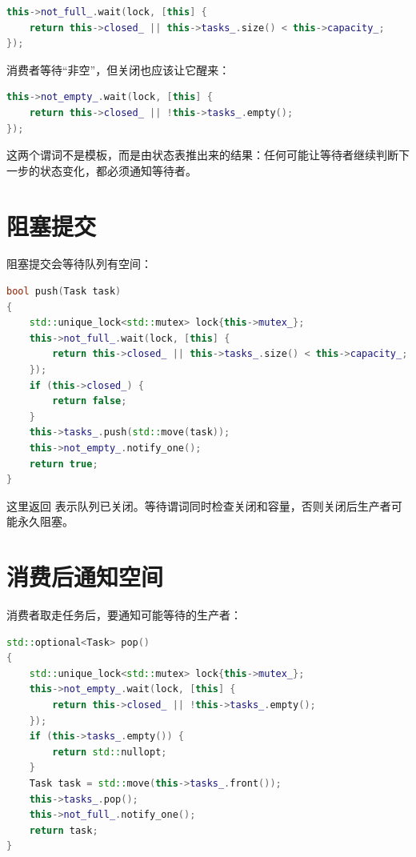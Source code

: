 \begin{lstlisting}[language=C++,caption={等待条件包含关闭状态}]
this->not_full_.wait(lock, [this] {
    return this->closed_ || this->tasks_.size() < this->capacity_;
});
\end{lstlisting}

消费者等待“非空”，但关闭也应该让它醒来：

\begin{lstlisting}[language=C++,caption={消费者等待条件也包含关闭状态}]
this->not_empty_.wait(lock, [this] {
    return this->closed_ || !this->tasks_.empty();
});
\end{lstlisting}

这两个谓词不是模板，而是由状态表推出来的结果：任何可能让等待者继续判断下一步的状态变化，都必须通知等待者。

\section{阻塞提交}

阻塞提交会等待队列有空间：

\begin{lstlisting}[language=C++,caption={队列满时等待}]
bool push(Task task)
{
    std::unique_lock<std::mutex> lock{this->mutex_};
    this->not_full_.wait(lock, [this] {
        return this->closed_ || this->tasks_.size() < this->capacity_;
    });
    if (this->closed_) {
        return false;
    }
    this->tasks_.push(std::move(task));
    this->not_empty_.notify_one();
    return true;
}
\end{lstlisting}

这里返回  表示队列已关闭。等待谓词同时检查关闭和容量，否则关闭后生产者可能永久阻塞。

\section{消费后通知空间}

消费者取走任务后，要通知可能等待的生产者：

\begin{lstlisting}[language=C++,caption={取任务后通知未满条件}]
std::optional<Task> pop()
{
    std::unique_lock<std::mutex> lock{this->mutex_};
    this->not_empty_.wait(lock, [this] {
        return this->closed_ || !this->tasks_.empty();
    });
    if (this->tasks_.empty()) {
        return std::nullopt;
    }
    Task task = std::move(this->tasks_.front());
    this->tasks_.pop();
    this->not_full_.notify_one();
    return task;
}
\end{lstlisting}

